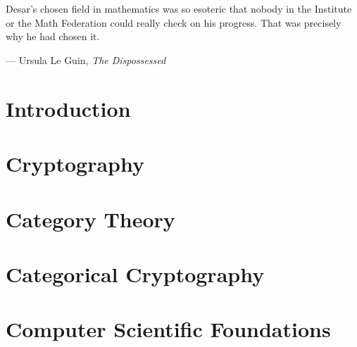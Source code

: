 \documentclass[12pt,twoside]{reedthesis}
\begin{document}


\tableofcontents

\chapter*{}
\begin{dedication}
  Desar's chosen field in mathematics was so esoteric that nobody in the
  Institute or the Math Federation could really check on his progress. That was
  precisely why he had chosen it.

  --- Ursula Le Guin, \emph{The Dispossessed}
\end{dedication}



\mainmatter%
\pagestyle{fancyplain} %

\chapter*{Introduction}


\chapter{Cryptography}
\label{chap:cryptography}


\chapter{Category Theory}
\label{chap:category-theory}


\chapter{Categorical Cryptography}
\label{chap:categorical-cryptography}


\appendix
\chapter{Computer Scientific Foundations}
\label{chap:cs-theory}


\backmatter{}
\nocite{*}
\printbibliography


\end{document}
